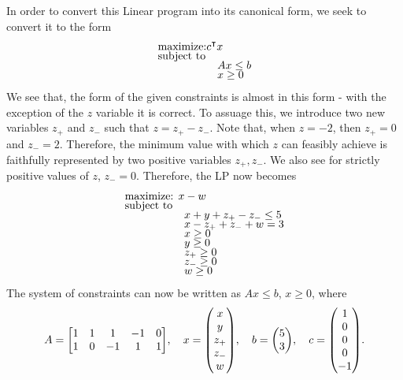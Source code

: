 \begin{solution}
\begin{enumerate}
        \hop
        In order to convert this Linear program into its canonical form, we seek to convert it to the form
        \begin{align*}
            &\text{maximize:} c\T x         \\[-1.5ex]
            &\text{subject to}      \\[-1.5ex]
            &\hspace{19mm} Ax \leq b\\[-1.5ex]
            &\hspace{19mm} x \geq 0
        \end{align*}
        We see that, the form of the given constraints is almost in this form - with the exception of the $z$ variable it is correct. To assuage this, we introduce two new variables $z_+$ and $z_-$ such that $z = z_+ - z_-$. Note that, when $z = -2$, then $z_+ = 0$ and $z_- = 2$. Therefore, the minimum value with which $z$ can feasibly achieve is faithfully represented by two positive variables $z_+, z_-$. We also see for strictly positive values of $z$, $z_- = 0$. Therefore, the LP now becomes 
        \begin{align*}
            &\text{maximize: } x - w                    \\[-1.5ex]
            &\text{subject to}                          \\[-1.5ex]
            & \hspace{19mm} x + y + z_+ - z_- \leq 5    \\[-1.5ex]
            & \hspace{19mm} x - z_+ + z_- + w = 3       \\[-1.5ex]
            & \hspace{19mm} x \geq 0                    \\[-1.5ex]
            & \hspace{19mm} y \geq 0                    \\[-1.5ex]
            & \hspace{19mm} z_+ \geq 0                  \\[-1.5ex]
            & \hspace{19mm} z_- \geq 0                  \\[-1.5ex]
            & \hspace{19mm} w \geq 0
        \end{align*}
        The system of constraints can now be written as $Ax \leq b$, $ x \geq 0$, where 
        \[A = \mqty[1&1&1&-1&0\\1&0&-1&1&1], \quad x = \mqty(x\\y\\z_+\\z_-\\w), \quad b = \mqty(5\\3), \quad c = \mqty(1\\0\\0\\0\\-1).\]


\end{enumerate}
\end{solution}
